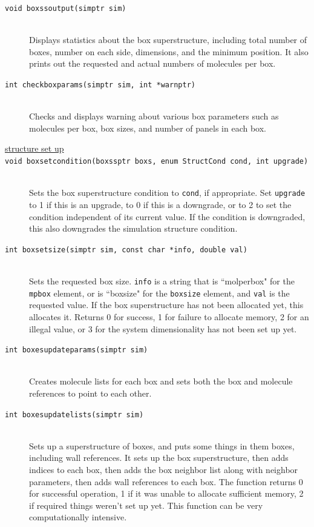 \documentclass {scrbook}
\newcommand {\ttt} {\texttt}
\begin{document}
\begin{description}
\item[\ttt{void boxssoutput(simptr sim)}]
\hfill \\
Displays statistics about the box superstructure, including total number of boxes, number on each side, dimensions, and the minimum position. It also prints out the requested and actual numbers of molecules per box.

\item[\ttt{int checkboxparams(simptr sim, int *warnptr)}]
\hfill \\
Checks and displays warning about various box parameters such as molecules per box, box sizes, and number of panels in each box.

\item[\underline{structure set up}]

\item[\ttt{void boxsetcondition(boxssptr boxs, enum StructCond cond, int upgrade)}]
\hfill \\
Sets the box superstructure condition to \ttt{cond}, if appropriate. Set \ttt{upgrade} to 1 if this is an upgrade, to 0 if this is a downgrade, or to 2 to set the condition independent of its current value. If the condition is downgraded, this also downgrades the simulation structure condition.

\item[\ttt{int boxsetsize(simptr sim, const char *info, double val)}]
\hfill \\
Sets the requested box size. \ttt{info} is a string that is ``molperbox" for the \ttt{mpbox} element, or is ``boxsize" for the \ttt{boxsize} element, and \ttt{val} is the requested value. If the box superstructure has not been allocated yet, this allocates it. Returns 0 for success, 1 for failure to allocate memory, 2 for an illegal value, or 3 for the system dimensionality has not been set up yet.

\item[\ttt{int boxesupdateparams(simptr sim)}]
\hfill \\
Creates molecule lists for each box and sets both the box and molecule references to point to each other.

\item[\ttt{int boxesupdatelists(simptr sim)}]
\hfill \\
Sets up a superstructure of boxes, and puts some things in them boxes, including wall references. It sets up the box superstructure, then adds indices to each box, then adds the box neighbor list along with neighbor parameters, then adds wall references to each box. The function returns 0 for successful operation, 1 if it was unable to allocate sufficient memory, 2 if required things weren't set up yet. This function can be very computationally intensive.


\end{description}
\end{document}
